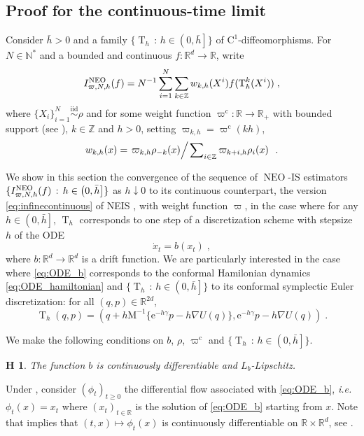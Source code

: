 \documentclass{article}
\newtheorem{assumption}{\textbf{H}\hspace{-3pt}}
\def\mass{\mathrm{M}}
\def\simiid{\overset{\operatorname{iid}}{\sim}}
\def\IFIS{\ensuremath{\operatorname{NEO}}}
\def\NEO{{\small \IFIS}}
\def\transfo{\operatorname{T}}
\def\rset{\mathbb{R}}
\def\nsets{\mathbb{N}^*}
\def\eqsp{\,}
\def\ie{\textit{i.e.}}
\def\eqsp{\;}
\newcommand{\ocint}[1]{\left(#1\right]}
\newcommand{\1}{\mathds{1}}
\def\rset{\mathbb{R}}
\def\zset{\mathbb{Z}}
\def\nsets{\mathbb{N}^*}
\def\rme{\mathrm{e}}
\def\rmc{\mathrm{C}}
\def\infineISh{I^{\NEO}_{\varpi,N,h}}
\def\varpic{\varpi^{\mathrm{c}}}
\begin{document}
\subsection{Proof for the continuous-time limit}
\label{subsec:continuous_time_proof}
Consider $\bar{h} >0$ and a family $\{\transfo_h \, : \, h \in \ocint{0,\bar{h}}\}$
of $\rmc^1$-diffeomorphisms. For $N \in \nsets$ and a bounded and continuous $f :\rset^d\to \rset$, write
\begin{equation}
  \label{eq:1}
  \infineISh(f) =  N^{-1} \sum_{i=1}^N \sum_{k\in\zset}w_{k,h}(X^i)  f(\transfo^k_h(X^i)) \eqsp,
\end{equation}
where $\{X_i\}_{i=1}^N \simiid \rho$ and for some weight function $\varpic : \rset \to \rset_+$ with bounded support (see ),
 $k \in \zset$ and $h >0$, setting $\varpi_{k,h} = \varpic(kh)$,
\begin{equation}
    \label{eq:def_w_k_h}
  { w_{k,h}(x)=\left.  \varpi_{k,h} \rho_{-k}(x) \middle / \left. \sum\nolimits_{i\in\zset}\varpi_{k+i,h} \rho_{i}(x) \right. \right. \eqsp.}
\end{equation}


We show in this section the convergence of the sequence of  \NEO-IS estimators $\{  \infineISh(f) \, : \, h \in \ocint{0,\bar{h}}\}$    as $h \downarrow 0$ to its 
continuous counterpart, the version \eqref{eq:infinecontinuous} of NEIS
\cite{rotskoff:vanden-eijden:2019}, with  weight
function $\varpi$,  in the case where for any $h \in \ocint{0,\bar{h}}$, 
$\transfo_h$  corresponds to one step of a 
discretization scheme with stepsize $h$ of the ODE
\begin{equation}
  \label{eq:ODE_b}
\dot{x}_t = b(x_t)   \eqsp,
\end{equation}
where $b :\rset^d \to \rset^d$ is a drift function. We are particularly interested in the case where \eqref{eq:ODE_b} corresponds to the conformal Hamilonian dynamics \eqref{eq:ODE_hamiltonian} and $\{\transfo_h \, : \, h \in \ocint{0,\bar{h}}\}$ to its conformal symplectic Euler discretization: for all $(q,p) \in \rset^{2d}$,
\begin{equation}
  \label{eq:def_SE_conformal_hamil}
  \transfo_h(q,p)=
 (q+h\mass^{-1}\{ \rme^{-h\gamma} p -h \nabla U(q)\},
 \rme^{-h \gamma } p -h \nabla U(q))\eqsp.
\end{equation}

 We make the following conditions on $b$, $\rho$, $\varpic$ and $\{\transfo_h \, : \, h \in \ocint{0,\bar{h}}\}$.
 \begin{assumption}
   \label{assum:drift_lip}
The function $b$ is continuously differentiable and $L_b$-Lipschitz.
\end{assumption}
Under , consider $(\phi_t)_{t \geq 0}$ the differential flow associated with \eqref{eq:ODE_b}, \ie~$\phi_t(x) = x_t$ where $(x_t)_{t \in \rset}$ is the solution of \eqref{eq:ODE_b} starting from $x$. Note that   implies that $(t,x) \mapsto \phi_t(x)$ is continuously differentiable on $\rset \times \rset^d$, see \cite[Theorem 4.1 Chapter V]{Har_1982}.
\end{document}
